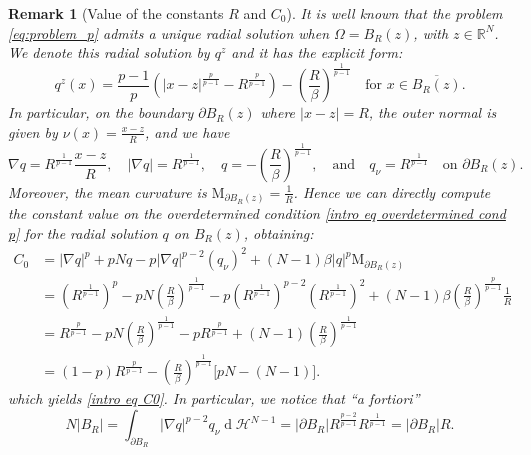 \documentclass[10pt,a4paper, reqno]{amsart}
\numberwithin{equation}{section}
\newcommand{\R}{\mathbb{R}}
\newtheorem{rem}[teo]{Remark}
\renewcommand{\d}[1]{\ensuremath{\operatorname{d}\!{#1}}}
\begin{document}
\begin{rem}[Value of the constants $R$ and $C_0$]
    It is well known that the problem \eqref{eq:problem_p} admits a unique radial solution when $\Omega = B_R(z)$, with $z \in \R^N$. We denote this radial solution by $q^z$ and it has the explicit form:
    \begin{equation*}
        q^z(x) = \frac{p-1}{p} \left(|x-z|^{\frac{p}{p-1}}-R^\frac{p}{p-1}\right) -\left(\frac{R}{\beta}\right)^\frac{1}{p-1} \quad \text{for } x \in \overline{B_R(z)}.
    \end{equation*}
    In particular, on the boundary $\partial B_R(z)$ where $|x-z| = R$, the outer normal is given by $\nu(x) = \frac{x-z}{R}$, and we have
    \begin{equation*}
        \nabla q = R^{\frac{1}{p-1}} \frac{x-z}{R}, \quad |\nabla q| = R^{\frac{1}{p-1}}, \quad q=-\left( \frac{R}{\beta} \right)^{\frac{1}{p-1}},  \quad \text{and} \quad q_\nu = R^{\frac{1}{p-1}} \quad \text{on } \partial B_R(z).
    \end{equation*}
    Moreover, the mean curvature is $\mathrm{M}_{\partial B_R(z)} = \frac{1}{R}$. Hence we can directly compute the constant value on the overdetermined condition \eqref{intro eq overdetermined cond p} for the radial solution $q$ on $B_R(z)$, obtaining:
    \begin{equation*}
        \begin{aligned}
        C_0 
        &= |\nabla q|^p + pNq - p|\nabla q|^{p-2} (q_\nu)^2 + (N-1)\beta|q|^p \mathrm{M}_{\partial B_R(z)} \\
        &= \left( R^{\frac{1}{p-1}} \right)^p - pN \left( \frac{R}{\beta} \right)^{\frac{1}{p-1}} - p \left( R^{\frac{1}{p-1}} \right)^{p-2} \left( R^{\frac{1}{p-1}} \right)^2 + (N-1)\beta \left( \frac{R}{\beta} \right)^{\frac{p}{p-1}} \frac{1}{R} \\
        &= R^{\frac{p}{p-1}} - pN \left( \frac{R}{\beta} \right)^{\frac{1}{p-1}} - p R^{\frac{p}{p-1}} + (N-1) \left( \frac{R}{\beta} \right)^{\frac{1}{p-1}}  \\
        &= (1-p)R^{\frac{p}{p-1}} - \left( \frac{R}{\beta} \right)^{\frac{1}{p-1}} \big[ pN - (N-1) \big].
        \end{aligned}
    \end{equation*}
    which yields \eqref{intro eq C0}. In particular, we notice that ``a fortiori''
    \begin{equation*}
        N|B_R| = \int_{\partial B_R} |\nabla q|^{p-2} q_\nu \d{}\mathcal{H}^{N-1} = |\partial B_R|R^\frac{p-2}{p-1}R^\frac{1}{p-1}=|\partial B_R|R.
    \end{equation*}
\end{rem}
\end{document}
